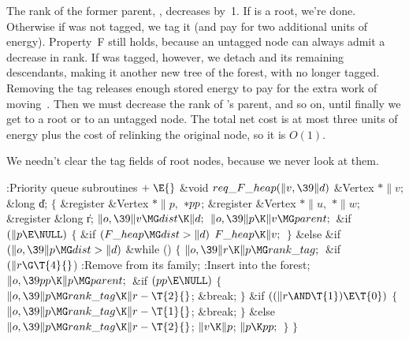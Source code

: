 The rank of the former parent, , decreases by~1. If  is a root,
we're done. Otherwise if  was not tagged, we tag it (and pay for
two additional units of energy). Property~F still holds, because an
untagged node can always admit a decrease in rank. If  was tagged,
however, we detach  and its remaining descendants, making it another
new tree of the forest, with  no longer tagged. Removing the tag
releases enough stored energy to pay for the extra work of moving~.
Then we must decrease the rank of 's parent, and so on, until finally
we get to a root or to an untagged node. The total net cost is at most
three units of energy plus the cost of relinking the original node,
so it is $O(1)$.

We needn't clear the tag fields of root nodes, because we never
look at them.

\Y\B\4:Priority queue subroutines\X${}\mathrel+\E{}$\6
\1\1\&{void} ${}\\{req\_F\_heap}(\|v,\39\|d){}$\6
\&{Vertex} ${}{*}\|v{}$;\6
\&{long} \|d;\2\2\6
${}\{{}$\5
\1\&{register} \&{Vertex} ${}{*}\|p,{}$ ${}{*}\\{pp}{}$;\6
\&{register} \&{Vertex} ${}{*}\|u,{}$ ${}{*}\|w{}$;\6
\&{register} \&{long} \|r;\7
${}\|o,\39\|v\MG\\{dist}\K\|d;{}$\6
${}\|o,\39\|p\K\|v\MG\\{parent};{}$\6
\&{if} ${}(\|p\E\NULL){}$\5
${}\{{}$\1\6
\&{if} ${}(\\{F\_heap}\MG\\{dist}>\|d){}$\1\5
${}\\{F\_heap}\K\|v;{}$\2\6
\4${}\}{}$\5
\2\&{else} \&{if} ${}(\|o,\39\|p\MG\\{dist}>\|d){}$\1\6
\&{while} ()\5
${}\{{}$\1\6
${}\|o,\39\|r\K\|p\MG\\{rank\_tag};{}$\6
\&{if} ${}(\|r\G\T{4}{}$)\1\6
:Remove  from its family\X;\2\6
:Insert  into the forest\X;\6
${}\|o,\39\\{pp}\K\|p\MG\\{parent};{}$\6
\&{if} ${}(\\{pp}\E\NULL){}$\5
${}\{{}$\1\6
${}\|o,\39\|p\MG\\{rank\_tag}\K\|r-\T{2}{}$;\5
\&{break};\6
\4${}\}{}$\2\6
\&{if} ${}((\|r\AND\T{1})\E\T{0}){}$\5
${}\{{}$\1\6
${}\|o,\39\|p\MG\\{rank\_tag}\K\|r-\T{1}{}$;\5
\&{break};\6
\4${}\}{}$\5
\2\&{else}\1\5
${}\|o,\39\|p\MG\\{rank\_tag}\K\|r-\T{2}{}$;\2\6
${}\|v\K\|p{}$;\5
${}\|p\K\\{pp};{}$\6
\4${}\}{}$\2\2\6
\4${}\}{}$\2\par
\fi


